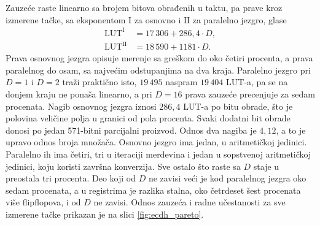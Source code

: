 \begin{table}[H]
\caption{Paralelno ECDH jezgro, implementacija van konteksta}
\centering
{\renewcommand{\arraystretch}{1.25}
}
\label{tab:ecdh_impl_f2}
\end{table}

Zauzeće raste linearno sa brojem bitova obrađenih u taktu, pa prave kroz izmerene tačke, sa eksponentom $\mathrm{I}$ za osnovno i $\mathrm{II}$ za paralelno jezgro, glase
\begin{align}
    \mathrm{LUT}^{\mathrm{I}}  &= 17\,306 + 286{,}4 \cdot D, \label{eq:ecdh_lut_f1} \\
    \mathrm{LUT}^{\mathrm{II}} &= 18\,590 + 1181 \cdot D. \label{eq:ecdh_lut_f2}
\end{align}
Prava osnovnog jezgra opisuje merenje sa greškom do oko četiri procenta, a prava paralelnog do osam, sa najvećim odstupanjima na dva kraja. Paralelno jezgro pri $D = 1$ i $D = 2$ traži praktično isto, $19\,495$ naspram $19\,404$ LUT-a, pa se na donjem kraju ne ponaša linearno, a pri $D = 16$ prava zauzeće precenjuje za sedam procenata.
\smallbreak
Nagib osnovnog jezgra iznosi $286{,}4$ LUT-a po bitu obrade, što je polovina veličine polja u granici od pola procenta. Svaki dodatni bit obrade donosi po jedan 571-bitni parcijalni proizvod.
\smallbreak
Odnos dva nagiba je $4{,}12$, a to je upravo odnos broja množača. Osnovno jezgro ima jedan, u aritmetičkoj jedinici. Paralelno ih ima četiri, tri u iteraciji merdevina i jedan u sopstvenoj aritmetičkoj jedinici, koju koristi završna konverzija. Sve ostalo što raste sa $D$ staje u preostala tri procenta. Deo koji od $D$ ne zavisi veći je kod paralelnog jezgra oko sedam procenata, a u registrima je razlika stalna, oko četrdeset šest procenata više flipflopova, i od $D$ ne zavisi. Odnos zauzeća i radne učestanosti za sve izmerene tačke prikazan je na slici \ref{fig:ecdh_pareto}.

